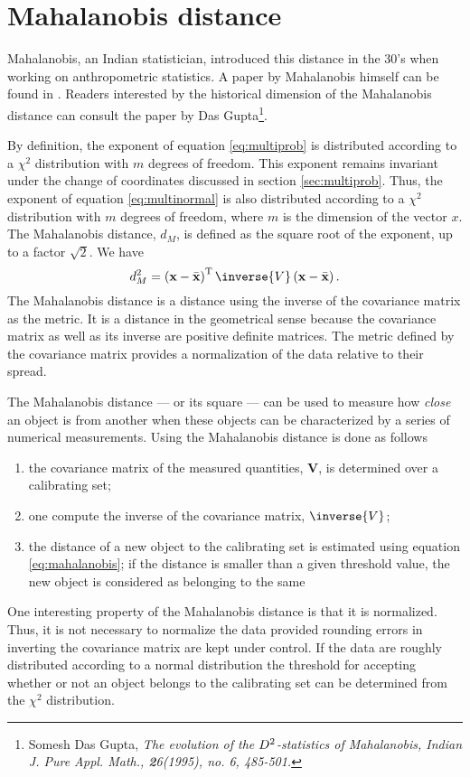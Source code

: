 \section{Mahalanobis distance}
\label{sec:mahalanobis} Mahalanobis, an Indian statistician,
introduced this distance in the 30's when working on
anthropometric statistics. A paper by Mahalanobis himself can be
found in \cite{AtchBry}. Readers interested by the historical
dimension of the Mahalanobis distance can consult the paper by Das
Gupta\footnote{Somesh Das Gupta, \em{The evolution of the $D\sp
2$-statistics of Mahalanobis}, Indian J. Pure Appl. Math., {\textbf
26}(1995), no. 6, 485-501.}.

By definition, the exponent of equation \ref{eq:multiprob} is
distributed according to a $\chi^2$ distribution with $m$ degrees
of freedom. This exponent remains invariant under the change of
coordinates discussed in section \ref{sec:multiprob}. Thus, the
exponent of equation \ref{eq:multinormal} is also distributed
according to a $\chi^2$ distribution with $m$ degrees of freedom,
where $m$ is the dimension of the vector $x$. The Mahalanobis
distance, $d_M$, is defined as the square root of the exponent, up
to a factor $\sqrt{2}$. We have
\begin{equation}
\label{eq:mahalanobis} d^2_M = \left({\textbf x}-\bar{{\textbf
x}}\right)^{\mathop{\textrm T}} \inverse{V}\left({\textbf x}-\bar{{\textbf
x}}\right).
\end{equation}
The Mahalanobis distance is a distance using the inverse of the
covariance matrix as the metric. It is a distance in the
geometrical sense because the covariance matrix as well as its
inverse are positive definite matrices. The metric defined by the
covariance matrix provides a normalization of the data relative to
their spread.

The Mahalanobis distance --- or its square --- can be used to
measure how \textsl{close} an object is from another when these
objects can be characterized by a series of numerical
measurements. Using the Mahalanobis distance is done as follows
\begin{enumerate}
  \item the covariance matrix of the measured quantities, $\textbf{V}$, is
determined over a calibrating set;
  \item one compute the inverse of the covariance matrix,
  $\inverse{V}$;
  \item the distance of a new object to the calibrating set is
  estimated using equation \ref{eq:mahalanobis}; if the distance
  is smaller than a given threshold value, the new object is
  considered as belonging to the same
\end{enumerate}
One interesting property of the Mahalanobis distance is that it is
normalized. Thus, it is not necessary to normalize the data
provided rounding errors in inverting the covariance matrix are
kept under control. If the data are roughly distributed according
to a normal distribution the threshold for accepting whether or
not an object belongs to the calibrating set can be determined
from the $\chi^2$ distribution.

